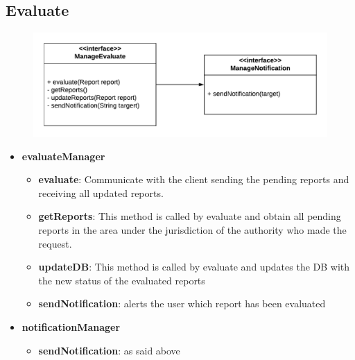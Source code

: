 \documentclass[12pt,a4paper]{report}
\begin{document}
			\subsection{Evaluate}
				\begin{figure}[H]
						\includegraphics[width = \textwidth, center]{evaluateInterface}
						\label{fig: interfaces}
				\end{figure}
				\begin{itemize}
						\item \textbf{evaluateManager}
						\begin{itemize}
							\item \textbf{evaluate}: Communicate with the client sending the pending reports and
								receiving all updated reports.
							\item \textbf{getReports}: This method is called by evaluate and obtain all pending
								reports in the area under the jurisdiction of the authority who made the request.
							\item \textbf{updateDB}: This method is called by evaluate and updates the DB with the
								new status of the evaluated reports
							\item \textbf{sendNotification}: alerts the user which report has been evaluated
						\end{itemize}
						\item \textbf{notificationManager}
						\begin{itemize}
							\item \textbf{sendNotification}: as said above
						\end{itemize}
				\end{itemize}
\end{document}
